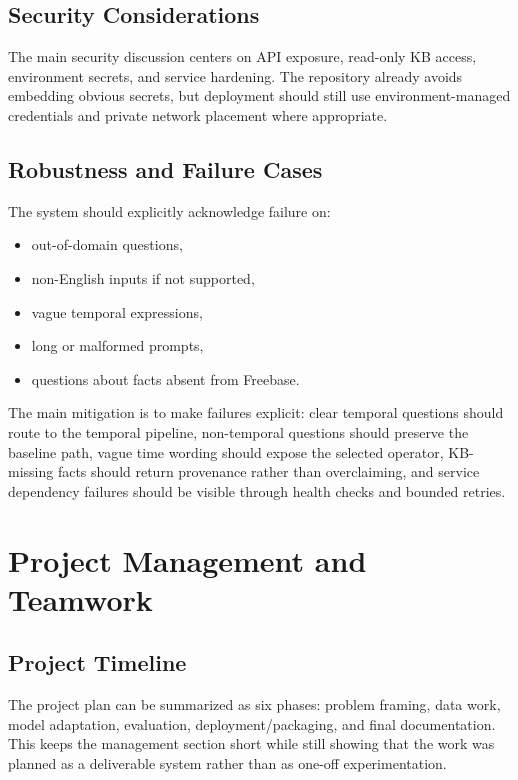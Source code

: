 \documentclass[a4paper,11pt]{article}
\begin{document}
\subsection{Security Considerations}

The main security discussion centers on API exposure, read-only KB access, environment secrets, and service hardening. The repository already avoids embedding obvious secrets, but deployment should still use environment-managed credentials and private network placement where appropriate.

\subsection{Robustness and Failure Cases}

The system should explicitly acknowledge failure on:

\begin{itemize}[leftmargin=1.2cm]
  \item out-of-domain questions,
  \item non-English inputs if not supported,
  \item vague temporal expressions,
  \item long or malformed prompts,
  \item questions about facts absent from Freebase.
\end{itemize}

The main mitigation is to make failures explicit: clear temporal questions should route to the temporal pipeline, non-temporal questions should preserve the baseline path, vague time wording should expose the selected operator, KB-missing facts should return provenance rather than overclaiming, and service dependency failures should be visible through health checks and bounded retries.

\section{Project Management and Teamwork}

\subsection{Project Timeline}

The project plan can be summarized as six phases: problem framing, data work, model adaptation, evaluation, deployment/packaging, and final documentation. This keeps the management section short while still showing that the work was planned as a deliverable system rather than as one-off experimentation.
\end{document}
